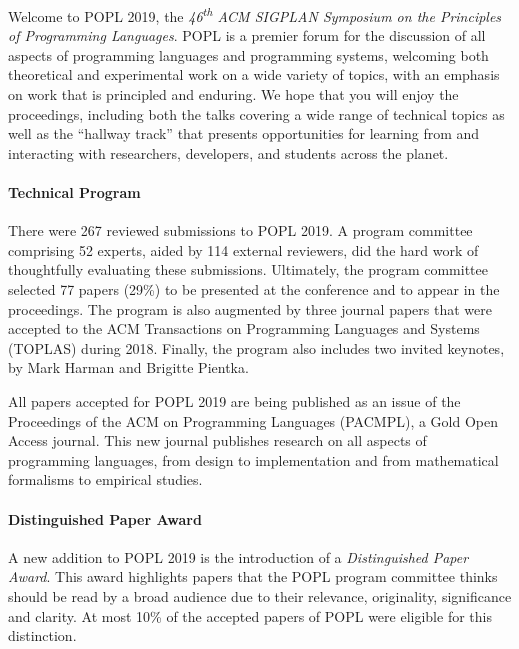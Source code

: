 \label{Preface}


\newcommand\person[1]{{#1}}

\noindent

Welcome to POPL 2019, the
\emph{46\textsuperscript{th} ACM SIGPLAN Symposium
on the Principles of Programming Languages}.
%
POPL is a premier forum for the discussion of all aspects
of programming languages and programming systems, welcoming
both theoretical and experimental work on a wide variety of
topics, with an emphasis on work that is principled and enduring.
%
We hope that you will enjoy the proceedings,
including both the talks covering a wide range
of technical topics as well as the ``hallway track''
that presents opportunities for learning from
and interacting with researchers, developers,
and students across the planet.


\paragraph{Technical Program}
%
There were 267 reviewed submissions to POPL 2019.
%
A program committee comprising 52 experts,
aided by 114 external reviewers, did the hard work of
thoughtfully evaluating these submissions.
%
Ultimately, the program committee selected 77 papers (29\%)
to be presented at the conference and to appear in the
proceedings. 
%
The program is also augmented by three journal papers that were accepted to
the ACM Transactions on Programming Languages and Systems (TOPLAS) during
2018.
%
Finally, the program also includes two invited keynotes, by Mark Harman
and Brigitte Pientka.

All papers accepted for POPL 2019 are being published as an issue of the
Proceedings of the ACM on Programming Languages (PACMPL), a Gold Open Access
journal. This new journal publishes research on all aspects of programming
languages, from design to implementation and from mathematical formalisms to
empirical studies.

\paragraph{Distinguished Paper Award}

A new addition to POPL 2019 is the introduction of a \emph{Distinguished Paper
Award}. This award highlights papers that the POPL program committee thinks
should be read by a broad audience due to their relevance, originality,
significance and clarity. At most 10\% of the accepted papers of POPL were
eligible for this distinction.

